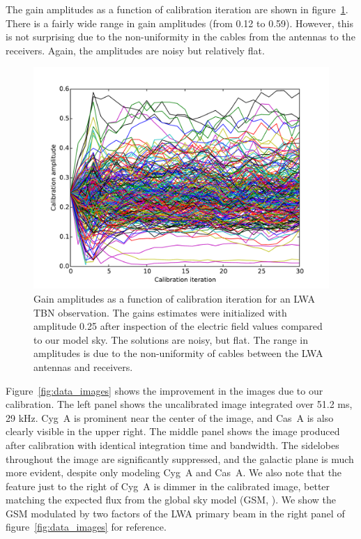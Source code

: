 \documentclass[a4paper,fleqn,usenatbib]{../mnras}
\begin{document}
The gain amplitudes as a function of calibration iteration are shown in figure~\ref{fig:data_amp}. There is a fairly wide range in gain amplitudes (from 0.12 to 0.59). However, this is not surprising due to the non-uniformity in the cables from the antennas to the receivers. Again, the amplitudes are noisy but relatively flat.

\begin{figure}
\begin{center}
\includegraphics[width=\columnwidth]{figures/cal_paper_data_amps.pdf}
\caption{Gain amplitudes as a function of calibration iteration for an LWA TBN observation. The gains estimates were initialized with amplitude 0.25 after inspection of the electric field values compared to our model sky. The solutions are noisy, but flat. The range in amplitudes is due to the non-uniformity of cables between the LWA antennas and receivers.
}
\label{fig:data_amp}
\end{center}
\end{figure}

Figure~\ref{fig:data_images} shows the improvement in the images due to our calibration. The left panel shows the uncalibrated image integrated over 51.2 ms, 29 kHz. Cyg~A is prominent near the center of the image, and Cas~A is also clearly visible in the upper right. The middle panel shows the image produced after calibration with identical integration time and bandwidth. The sidelobes throughout the image are significantly suppressed, and the galactic plane is much more evident, despite only modeling Cyg~A and Cas~A. We also note that the feature just to the right of Cyg~A is dimmer in the calibrated image, better matching the expected flux from the global sky model (GSM, \citealt{deo08}). We show the GSM modulated by two factors of the LWA primary beam in the right panel of figure~\ref{fig:data_images} for reference.
\end{document}
